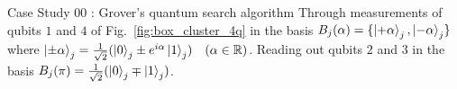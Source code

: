 \documentclass[final]{beamer}
\newlength{\colwidth}
\begin{document}
\begin{frame}[t]
\begin{columns}[t]
\begin{column}{\colwidth}
\begin{block}{Case Study 00 : Grover's quantum search algorithm}
                    Through measurements of qubits $1$ and $4$ of Fig.~\ref{fig:box_cluster_4q} in the
                    basis $B_j(\alpha) = \{\ket{+\alpha}_j, \ket{-\alpha}_j\}$
                    where $\ket{\pm \alpha}_j = \frac{1}{\sqrt{2}}(\ket{0}_j \pm
                    e^{i\alpha}\ket{1}_j) \quad (\alpha \in \mathbb{R})$. Reading out
                    qubits $2$ and $3$ in the basis $B_j(\pi) =
                    \frac{1}{\sqrt{2}}(\ket{0}_j \mp \ket{1}_j)$.

                    \begin{figure}[H]
                        \raggedright
                        \begin{minipage}[c]{0.40\textwidth}
\end{minipage}
\end{figure}
\end{block}
\end{column}
\end{columns}
\end{frame}
\end{document}
